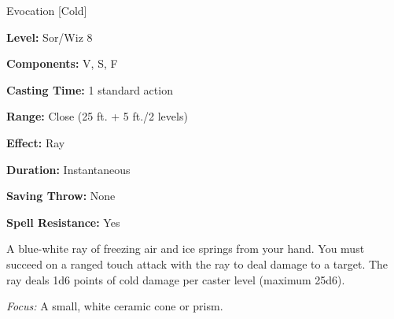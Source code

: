 
Evocation [Cold]

\textbf{Level:} Sor/Wiz 8

\textbf{Components:} V, S, F

\textbf{Casting Time:} 1 standard action

\textbf{Range:} Close (25 ft. + 5 ft./2 levels)

\textbf{Effect:} Ray

\textbf{Duration:} Instantaneous

\textbf{Saving Throw:} None

\textbf{Spell Resistance:} Yes

A blue-white ray of freezing air and ice springs from your hand. You must succeed 
on a ranged touch attack with the ray to deal damage to a target. The ray deals 
1d6 points of cold damage per caster level (maximum 25d6).

\textit{Focus:} A small, white ceramic cone or prism.

